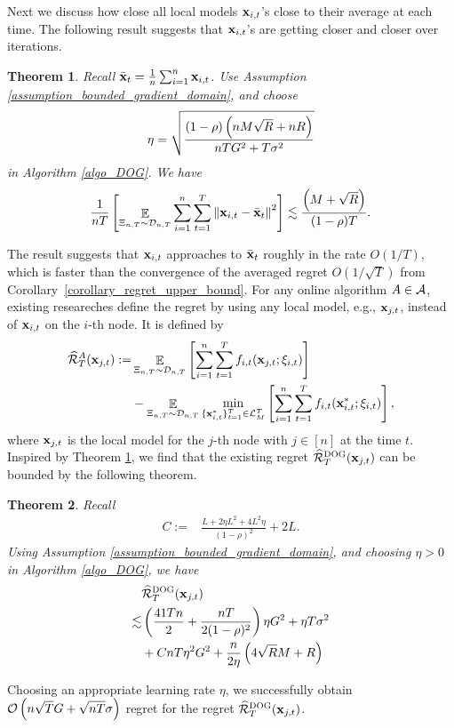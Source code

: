 \documentclass{article}
\newtheorem{Theorem}{\bf{Theorem}}
\begin{document}
Next we discuss how close all local models ${\bf x}_{i,t}$'s close to their average at each time. The following result suggests that ${\bf x}_{i,t}$'s are getting closer and closer over iterations.
\begin{Theorem}
\label{theorem_local_models_closer}
Recall $\bar{{\bf x}}_t = \frac{1}{n}\sum_{i=1}^n {\bf x}_{i,t}$.
Use Assumption \ref{assumption_bounded_gradient_domain}, and choose 
\begin{align}
\nonumber
\eta = \sqrt{\frac{(1-\rho) \left( nM\sqrt{R} + nR \right)}{ nTG^2 + T\sigma^2 }}
\end{align} in Algorithm \ref{algo_DOG}. We have 
\begin{align}
\nonumber
{1\over nT}\left[\mathop{\mathbb{E}}_{ \Xi_{n,T} \sim \mathcal{D}_{n,T} } \sum_{i=1}^n\sum_{t=1}^T \left\lVert{\bf x}_{i,t} - \bar{{\bf x}}_t\right\rVert^2\right] \lesssim \frac{\left( M + \sqrt{R} \right)}{(1-\rho)T}.
\end{align}
\end{Theorem}
The result suggests that ${\bf x}_{i,t}$ approaches to $\bar{{\bf x}}_t$ roughly in the rate $O(1/{T})$, which is faster than the convergence of the averaged regret $O(1/\sqrt{T})$ from Corollary~\ref{corollary_regret_upper_bound}. For any online algorithm $A\in{\mathcal{A}}$, existing researeches \citep{pmlr-v70-zhang17g} define the regret by using any local model, e.g., ${\bf x}_{j,t}$, instead of ${\bf x}_{i,t}$ on the $i$-th node. It is defined by 
\begin{align}
\nonumber
\widehat{{\mathcal{R}}}_T^{A}({\bf x}_{j,t}) := & \mathop{\mathbb{E}}_{\Xi_{n,T} \sim \mathcal{D}_{n,T}}\left [\sum_{i=1}^n \sum_{t=1}^T f_{i,t}({\bf x}_{j,t};\xi_{i,t})\right ] \\ \nonumber
& - \mathop{\mathbb{E}}_{\Xi_{n,T} \sim \mathcal{D}_{n,T}}\min_{\{{\bf x}_{i,t}^\ast\}_{t=1}^T \in {\mathcal{L}}_M^T}\left [\sum_{i=1}^n \sum_{t=1}^T f_{i,t}({\bf x}_{i,t}^\ast;\xi_{i,t})\right ],
\end{align} 
where ${\bf x}_{j,t}$ is the local model for the $j$-th node with $j\in[n]$ at the time $t$. Inspired by Theorem \ref{theorem_local_models_closer}, we find that the existing regret $\widehat{{\mathcal{R}}}_T^{\textsc{DOG}}({\bf x}_{j,t})$ can be bounded by the following theorem.
\begin{Theorem}
\label{theorem_implied_other_regret_bound}
Recall 
\begin{align}
\nonumber
C := & \frac{L + 2\eta L^2  + 4L^2 \eta}{(1-\rho)^2} +2L.
\end{align}  Using Assumption \ref{assumption_bounded_gradient_domain}, and choosing $\eta>0$ in Algorithm \ref{algo_DOG}, we have
\begin{align}
\nonumber
&\widehat{{\mathcal{R}}}_T^{\textsc{DOG}}({\bf x}_{j,t}) \\ \nonumber
\lesssim & \left( \frac{41 T n}{2} + \frac{nT}{2(1-\rho)^2} \right) \eta G^2 +  \eta T\sigma^2 \\ \nonumber
& + C nT\eta^2 G^2  + \frac{n}{2\eta}\left(  4\sqrt{R}M + R   \right)
\end{align}
\end{Theorem} Choosing an appropriate learning rate $\eta$, we successfully obtain ${\mathcal{O}\left( n\sqrt{T}G + \sqrt{nT}\sigma \right)}$ regret for the regret $\widehat{{\mathcal{R}}}_T^{\textsc{DOG}}({\bf x}_{j,t})$.
\end{document}
